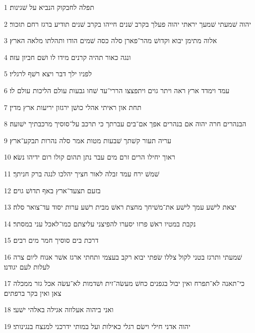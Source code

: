 \par 1 תפלה לחבקוק הנביא על שׁגינות׃
\par 2 יהוה שׁמעתי שׁמעך יראתי יהוה פעלך בקרב שׁנים חייהו בקרב שׁנים תודיע ברגז רחם תזכור׃
\par 3 אלוה מתימן יבוא וקדושׁ מהר־פארן סלה כסה שׁמים הודו ותהלתו מלאה הארץ׃
\par 4 ונגה כאור תהיה קרנים מידו לו ושׁם חביון עזה׃
\par 5 לפניו ילך דבר ויצא רשׁף לרגליו׃
\par 6 עמד וימדד ארץ ראה ויתר גוים ויתפצצו הררי־עד שׁחו גבעות עולם הליכות עולם לו׃
\par 7 תחת און ראיתי אהלי כושׁן ירגזון יריעות ארץ מדין׃
\par 8 הבנהרים חרה יהוה אם בנהרים אפך אם־בים עברתך כי תרכב על־סוסיך מרכבתיך ישׁועה׃
\par 9 עריה תעור קשׁתך שׁבעות מטות אמר סלה נהרות תבקע־ארץ׃
\par 10 ראוך יחילו הרים זרם מים עבר נתן תהום קולו רום ידיהו נשׂא׃
\par 11 שׁמשׁ ירח עמד זבלה לאור חציך יהלכו לנגה ברק חניתך׃
\par 12 בזעם תצעד־ארץ באף תדושׁ גוים׃
\par 13 יצאת לישׁע עמך לישׁע את־משׁיחך מחצת ראשׁ מבית רשׁע ערות יסוד עד־צואר סלה׃
\par 14 נקבת במטיו ראשׁ פרזו יסערו להפיצני עליצתם כמו־לאכל עני במסתר׃
\par 15 דרכת בים סוסיך חמר מים רבים׃
\par 16 שׁמעתי ותרגז בטני לקול צללו שׂפתי יבוא רקב בעצמי ותחתי ארגז אשׁר אנוח ליום צרה לעלות לעם יגודנו׃
\par 17 כי־תאנה לא־תפרח ואין יבול בגפנים כחשׁ מעשׂה־זית ושׁדמות לא־עשׂה אכל גזר ממכלה צאן ואין בקר ברפתים׃
\par 18 ואני ביהוה אעלוזה אגילה באלהי ישׁעי׃
\par 19 יהוה אדני חילי וישׂם רגלי כאילות ועל במותי ידרכני למנצח בנגינותי׃



